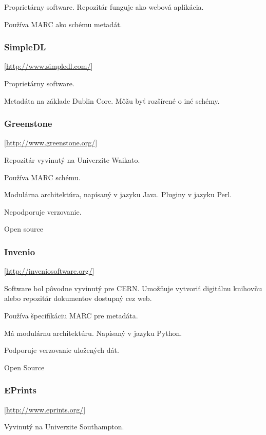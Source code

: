 \documentclass[thesis=M,slovak]{FITthesis}[2013/05/06]
\begin{document}
Proprietárny software. Repozitár funguje ako webová aplikácia.

Používa MARC ako schému metadát.

\subsubsection {SimpleDL}  [\url{http://www.simpledl.com/}]

Proprietárny software.

Metadáta na základe Dublin Core. Môžu byť rozšírené o iné schémy.

\subsubsection {Greenstone}  [\url{http://www.greenstone.org/}]

Repozitár vyvinutý na Univerzite Waikato.

Používa MARC schému.

Modulárna architektúra, napísaný v jazyku Java. Pluginy v jazyku Perl.

Nepodporuje verzovanie.

Open source

\subsubsection {Invenio}  [\url{http://inveniosoftware.org/}]

Software bol pôvodne vyvinutý pre CERN. Umožňuje vytvoriť digitálnu knihovňu alebo repozitár dokumentov dostupný cez web. 

Používa špecifikáciu MARC pre metadáta.

Má modulárnu architektúru. Napísaný v jazyku Python.

Podporuje verzovanie uložených dát.

Open Source

%

\subsubsection {EPrints} [\url{http://www.eprints.org/}]

Vyvinutý na Univerzite Southampton.
\end{document}
